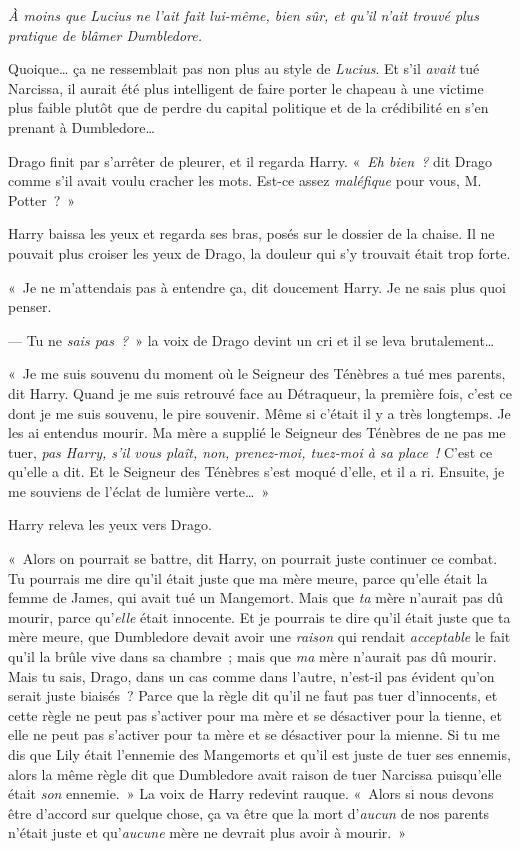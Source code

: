 \emph{À moins que Lucius ne l'ait fait lui-même, bien sûr, et qu'il n'ait trouvé plus pratique de blâmer Dumbledore.}

Quoique… ça ne ressemblait pas non plus au style de \emph{Lucius}.
Et s'il \emph{avait} tué Narcissa, il aurait été plus intelligent de faire porter le chapeau à une victime plus faible plutôt que de perdre du capital politique et de la crédibilité en s'en prenant à Dumbledore…

Drago finit par s'arrêter de pleurer, et il regarda Harry.
«~\emph{Eh bien~?} dit Drago comme s'il avait voulu cracher les mots.
Est-ce assez \emph{maléfique} pour vous, M. Potter~?~»

Harry baissa les yeux et regarda ses bras, posés sur le dossier de la chaise.
Il ne pouvait plus croiser les yeux de Drago, la douleur qui s'y trouvait était trop forte.

«~Je ne m'attendais pas à entendre ça, dit doucement Harry.
Je ne sais plus quoi penser.

--- Tu ne \emph{sais pas~?}~» la voix de Drago devint un cri et il se leva brutalement…

«~Je me suis souvenu du moment où le Seigneur des Ténèbres a tué mes parents, dit Harry.
Quand je me suis retrouvé face au Détraqueur, la première fois, c'est ce dont je me suis souvenu, le pire souvenir.
Même si c'était il y a très longtemps.
Je les ai entendus mourir.
Ma mère a supplié le Seigneur des Ténèbres de ne pas me tuer, \emph{pas Harry, s'il vous plaît, non, prenez-moi, tuez-moi à sa place~!} C'est ce qu'elle a dit.
Et le Seigneur des Ténèbres s'est moqué d'elle, et il a ri.
Ensuite, je me souviens de l'éclat de lumière verte…~»

Harry releva les yeux vers Drago.

«~Alors on pourrait se battre, dit Harry, on pourrait juste continuer ce combat.
Tu pourrais me dire qu'il était juste que ma mère meure, parce qu'elle était la femme de James, qui avait tué un Mangemort.
Mais que \emph{ta} mère n'aurait pas dû mourir, parce qu'\emph{elle} était innocente.
Et je pourrais te dire qu'il était juste que ta mère meure, que Dumbledore devait avoir une \emph{raison} qui rendait \emph{acceptable} le fait qu'il la brûle vive dans sa chambre~; mais que \emph{ma} mère n'aurait pas dû mourir.
Mais tu sais, Drago, dans un cas comme dans l'autre, n'est-il pas évident qu'on serait juste biaisés~?
Parce que la règle dit qu'il ne faut pas tuer d'innocents, et cette règle ne peut pas s'activer pour ma mère et se désactiver pour la tienne, et elle ne peut pas s'activer pour ta mère et se désactiver pour la mienne.
Si tu me dis que Lily était l'ennemie des Mangemorts et qu'il est juste de tuer ses ennemis, alors la même règle dit que Dumbledore avait raison de tuer Narcissa puisqu'elle était \emph{son} ennemie.~»
La voix de Harry redevint rauque.
«~Alors si nous devons être d'accord sur quelque chose, ça va être que la mort d'\emph{aucun} de nos parents n'était juste et qu'\emph{aucune} mère ne devrait plus avoir à mourir.~»

